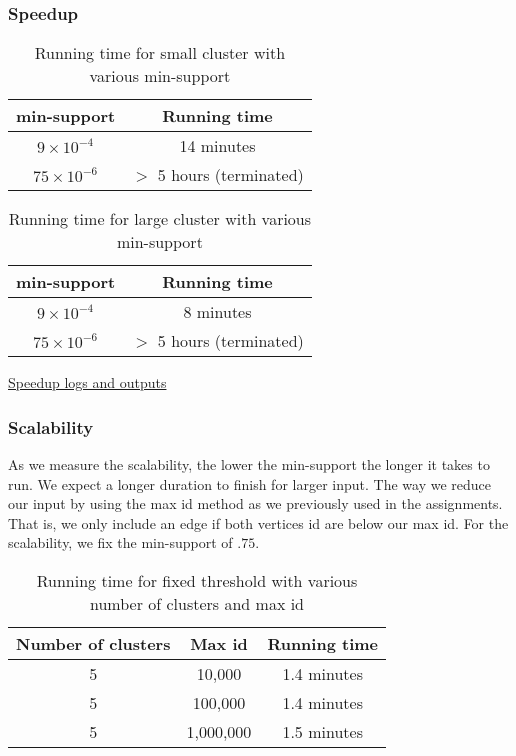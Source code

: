 \documentclass[11pt]{article}
\begin{document}
\subsubsection{Speedup}


\begin{table}[h!]
    \centering
    \begin{tabular}{||c c||}
        \hline
        min-support & Running time \\
        \hline\hline
        $9 \times 10^{-4}$ & 14 minutes \\
        $75 \times 10^{-6}$ & $>$ 5 hours (terminated) \\
        \hline
    \end{tabular}
    \caption{Running time for small cluster with various min-support}
    \label{table:2}
\end{table}

\begin{table}[h!]
    \centering
    \begin{tabular}{||c c||}
        \hline
        min-support & Running time \\
        \hline\hline
        $9 \times 10^{-4}$ & 8 minutes \\
        $75 \times 10^{-6}$ & $>$ 5 hours (terminated) \\
        \hline
    \end{tabular}
    \caption{Running time for large cluster with various min-support}
    \label{table:3}
\end{table}

\href{https://github.ccs.neu.edu/prdx/CS6240-Project/tree/master/awsSpeedUpRuns}{Speedup logs and outputs}

\subsubsection{Scalability}

As we measure the scalability, the lower the min-support the longer it takes to run.
We expect a longer duration to finish for larger input.
The way we reduce our input by using the max id method as we previously used in the assignments.
That is, we only include an edge if both vertices id are below our max id.
For the scalability, we fix the min-support of $.75$.

\begin{table}[h!]
    \centering
    \begin{tabular}{||c c c||}
        \hline
        Number of clusters & Max id & Running time \\
        \hline\hline
        5 & 10,000 & 1.4 minutes \\
        5 & 100,000 & 1.4 minutes \\
        5 & 1,000,000 & 1.5 minutes \\
        \hline
    \end{tabular}
    \caption{Running time for fixed threshold with various number of clusters and max id}
    \label{table:4}
\end{table}
\end{document}
